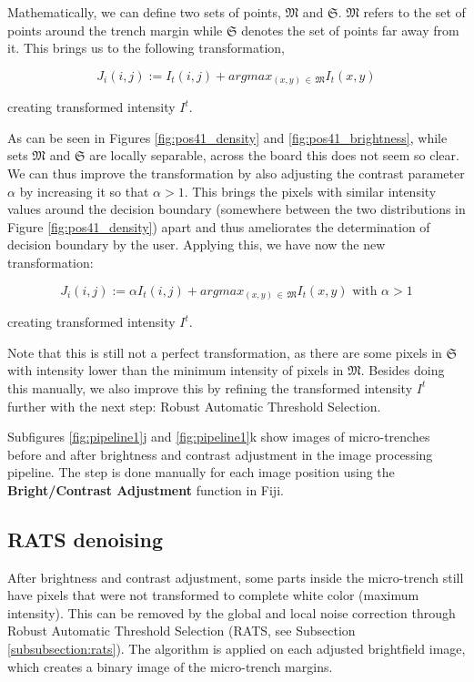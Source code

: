 \documentclass[pdftex,12pt,a4paper]{report}
\begin{document}
Mathematically, we can define two sets of points, $\mathfrak{M}$ and $\mathfrak{S}$. $\mathfrak{M}$ refers to the set of points around the trench margin while $\mathfrak{S}$ denotes the set of points far away from it. This brings us to the following transformation,

$$
J_i(i, j) := I_t(i, j) + argmax_{(x, y) \, \in \, \mathfrak{M}}{I_t(x, y)}
$$

creating transformed intensity $I^t$.

As can be seen in Figures \ref{fig:pos41_density} and \ref {fig:pos41_brightness}, while sets $\mathfrak{M}$ and $\mathfrak{S}$ are locally separable, across the board this does not seem so clear. We can thus improve the transformation by also adjusting the contrast parameter $\alpha$ by increasing it so that $\alpha > 1$. This brings the pixels with similar intensity values around the decision boundary (somewhere between the two distributions in Figure \ref{fig:pos41_density}) apart and thus ameliorates the determination of decision boundary by the user. Applying this, we have now the new transformation:

$$
J_i(i, j) := \alpha I_t(i, j) + argmax_{(x, y) \, \in \, \mathfrak{M}}{I_t(x, y)} \text{ with } \alpha > 1
$$

creating transformed intensity $I^t$.

Note that this is still not a perfect transformation, as there are some pixels in $\mathfrak{S}$ with intensity lower than the minimum intensity of pixels in $\mathfrak{M}$. Besides doing this manually, we also improve this by refining the transformed intensity $I^t$ further with the next step: Robust Automatic Threshold Selection.

Subfigures \ref{fig:pipeline1}j and \ref{fig:pipeline1}k show images of micro-trenches before and after brightness and contrast adjustment in the image processing pipeline.  The step is done manually for each image position using the \textbf{Bright/Contrast Adjustment} function in Fiji.

\subsection{RATS denoising}
\label{subsubsection:brightness_contrast_adjustment}

After brightness and contrast adjustment, some parts inside the micro-trench still have pixels  that were not transformed to complete white color (maximum intensity). This can be removed by the global and local noise correction through Robust Automatic Threshold Selection (RATS, see Subsection \ref{subsubsection:rats}). The algorithm is applied on each adjusted brightfield image, which creates a binary image of the micro-trench margins.
\end{document}

